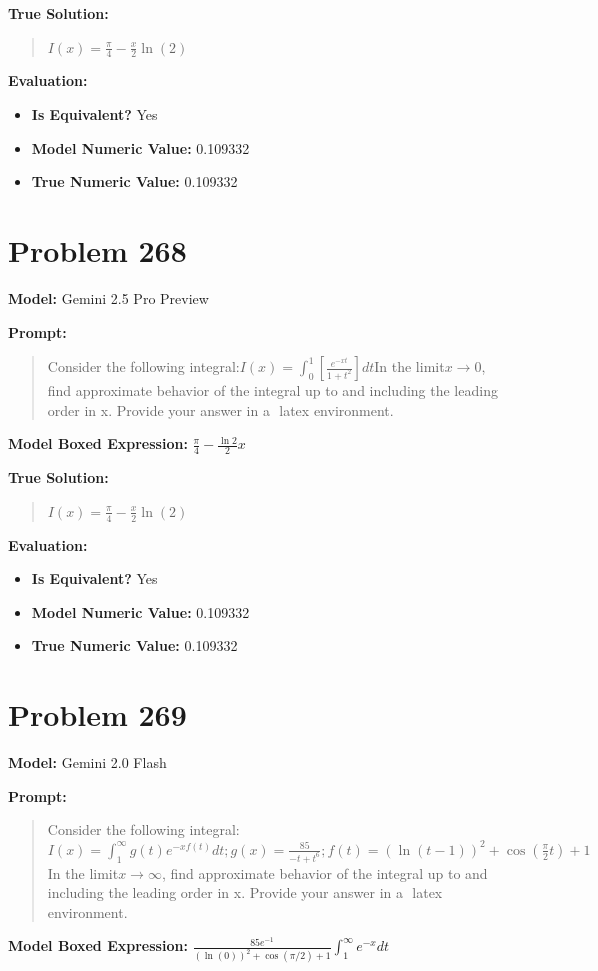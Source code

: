 \documentclass{article}
\begin{document}
{\textbf{True Solution:}
\begin{quote}
$I(x) = \frac{\pi}{4}-\frac{x}{2}\ln(2)$
\end{quote}

\textbf{Evaluation:}
\begin{itemize}
\item \textbf{Is Equivalent?} Yes
\item \textbf{Model Numeric Value:} 0.109332
\item \textbf{True Numeric Value:} 0.109332
\end{itemize}
\vspace{1cm}
\section*{Problem 268}
\textbf{Model:} Gemini 2.5 Pro Preview

\textbf{Prompt:}
\begin{quote}
Consider the following integral:$I(x) = \int_0^1[\frac{e^{-xt}}{1+t^2}]dt$In the limit$x \rightarrow 0$, find approximate behavior of the integral up to and including the leading order in x. Provide your answer in a $\boxed{}$ latex environment.
\end{quote}
\textbf{Model Boxed Expression:} $\frac{\pi}{4} - \frac{\ln 2}{2}x$

\textbf{True Solution:}
\begin{quote}
$I(x) = \frac{\pi}{4}-\frac{x}{2}\ln(2)$
\end{quote}

\textbf{Evaluation:}
\begin{itemize}
\item \textbf{Is Equivalent?} Yes
\item \textbf{Model Numeric Value:} 0.109332
\item \textbf{True Numeric Value:} 0.109332
\end{itemize}
\vspace{1cm}
\section*{Problem 269}
\textbf{Model:} Gemini 2.0 Flash

\textbf{Prompt:}
\begin{quote}
Consider the following integral:$I(x) = \int_1^\infty g(t) e^{-xf(t)}dt; g(x)=\frac{85}{-t+t^6}; f(t) = (\ln(t-1))^2 + \cos(\frac{\pi}{2} t) + 1$In the limit$x \rightarrow \infty$, find approximate behavior of the integral up to and including the leading order in x. Provide your answer in a $\boxed{}$ latex environment.
\end{quote}
\textbf{Model Boxed Expression:} $\frac{85e^{-1}}{(\ln(0))^2 + \cos(\pi/2) + 1} \int_1^\infty e^{-x} dt$

}
\end{document}
